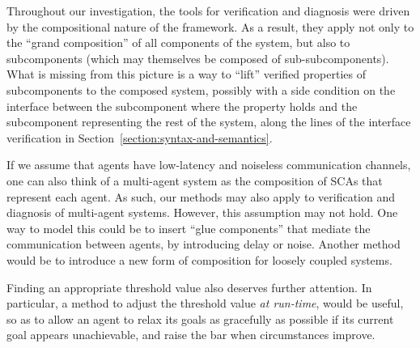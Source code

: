 \documentclass[a4paper]{article}
\theoremstyle{definition}
\begin{document}
Throughout our investigation, the tools for verification and diagnosis were driven by the compositional nature of the framework. As a result, they apply not only to the ``grand composition'' of all components of the system, but also to subcomponents (which may themselves be composed of sub-subcomponents). What is missing from this picture is a way to ``lift'' verified properties of subcomponents to the composed system, possibly with a side condition on the interface between the subcomponent where the property holds and the subcomponent representing the rest of the system, along the lines of the interface verification in Section~\ref{section:syntax-and-semantics}.

If we assume that agents have low-latency and noiseless communication channels, one can also think of a multi-agent system as the composition of SCAs that represent each agent. As such, our methods may also apply to verification and diagnosis of multi-agent systems. However, this assumption may not hold. One way to model this could be to insert ``glue components'' that mediate the communication between agents, by introducing delay or noise. Another method would be to introduce a new form of composition for loosely coupled systems.


Finding an appropriate threshold value also deserves further attention. In particular, a method to adjust the threshold value \emph{at run-time}, would be useful, so as to allow an agent to relax its goals as gracefully as possible if its current goal appears unachievable, and raise the bar when circumstances improve.

\end{document}

